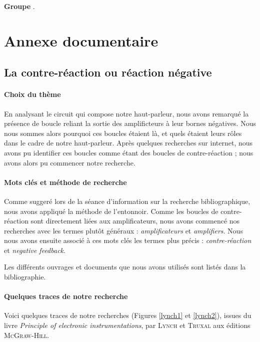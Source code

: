 

\textbf{Groupe }.

\section{Annexe documentaire}

\subsection{La contre-réaction ou réaction négative}

\paragraph{Choix du thème}
En analysant le circuit qui compose notre haut-parleur, nous avons remarqué
la présence de boucle reliant la sortie des amplificteurs à leur bornes négatives.
Nous nous sommes alors pourquoi ces boucles étaient là, et quels étaient leurs rôles
dans le cadre de notre haut-parleur. Après quelques recherches sur internet, nous avons
pu identifier ces boucles comme étant des boucles de contre-réaction ; nous avons
alors pu commencer notre recherche.

\paragraph{Mots clés et méthode de recherche}
Comme suggeré lors de la séance d'information sur la recherche bibliographique,
nous avons appliqué la méthode de l'entonnoir. Comme les boucles de contre-réaction 
sont directement liées aux amplificateurs, nous avons commencé nos recherches avec 
les termes plutôt généraux : \textit{amplificateurs} et \textit{amplifiers}. Nous 
nous avons ensuite associé à ces mots clés les termes plus précis : \textit{contre-réaction}
et \textit{negative feedback}.

Les différents ouvrages et documents que nous avons utilisés sont listés dans la bibliographie.

\paragraph{Quelques traces de notre recherche}
Voici quelques traces de notre recherches (Figures \ref{lynch1} et \ref{lynch2}), issues du livre 
\textit{Principle of electronic instrumentations},
par \textsc{Lynch} et \textsc{Truxal} aux éditions \textsc{McGraw-Hill}.

